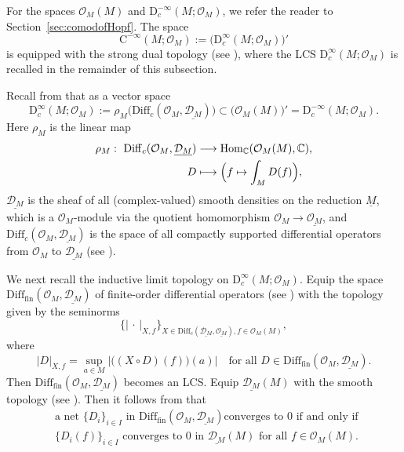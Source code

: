 \documentclass[12pt, a4paper]{amsart}
\newcommand{\CO}{{\mathcal {O}}}
\newcommand{\RC}{{\mathrm {C}}}
\newcommand{\RD}{{\mathrm {D}}}
\newcommand{\abs}[1]{\lvert#1\rvert}
\newcommand{\be}{\begin {equation}}
\newcommand{\ee}{\end {equation}}
\theoremstyle{Theorem}
\theoremstyle{Theorem}
\theoremstyle{Theorem}
\theoremstyle{Theorem}
\theoremstyle{Plain}
\theoremstyle{remark}
\theoremstyle{remark}
\theoremstyle{Definition}
\numberwithin{equation}{section}
\begin{document}
For the spaces $\CO_M(M)$ and $\RD^{-\infty}_c(M;\CO_M)$, we refer the reader to Section~\ref{sec:comodofHopf}. 
The space
\[
\RC^{-\infty}(M;\CO_M) := \bigl(\RD^{\infty}_c(M;\CO_M)\bigr)'
\]
is equipped with the strong dual topology (see \cite[(3.1)]{CSW2}), 
where the LCS $\RD^{\infty}_c(M;\CO_M)$ is recalled in the remainder of this subsection.

Recall from  \cite[(2.3)]{CSW2} that as a vector space 
\[
\RD^{\infty}_c(M;\CO_M)
:= \rho_M\bigl(\mathrm{Diff}_{c}(\CO_M,\underline{\mathcal{D}_M})\bigr)
\subset \bigl(\CO_M(M)\bigr)' = \RD^{-\infty}_c(M;\CO_M).
\]
 Here $\rho_M$ is the linear map
\begin{equation}
\begin{split}
\rho_M:\ \mathrm{Diff}_{c}(\CO_M,\underline{\mathcal{D}_M})
&\longrightarrow \mathrm{Hom}_{\mathbb C}(\CO_M(M),\mathbb C),\\
D &\longmapsto \Bigl( f \mapsto \int_{M} D(f) \Bigr),
\end{split}
\label{eq:defcomsuppden}
\end{equation}
$\underline{\mathcal{D}_M}$ is the sheaf of all (complex-valued) smooth densities on the reduction 
$\underline{M}$, which is a $\CO_M$-module via the quotient homomorphism $\CO_M\to\underline{\CO_M}$, 
and $\mathrm{Diff}_{c}(\CO_M,\underline{\mathcal{D}_M})$ is the space of all compactly supported differential operators from $\CO_M$ 
to $\underline{\mathcal{D}_M}$ (see \cite[Section 3.2]{CSW1}).


We next recall the inductive limit topology on $\RD^{\infty}_c(M;\CO_M)$.
Equip the space $\mathrm{Diff}_{\mathrm{fin}} (\CO_M,\underline{\mathcal{D}_M})$ of  finite-order differential operators (see \cite[Definition 3.6]{CSW1}) with the topology given by the seminorms \[\{\abs{\,\cdot\,}_{X,f}\}_{X\in \mathrm{Diff}_c(\underline{\mathcal{D}_M},\underline{\CO_M}), f\in \CO_M(M)},\] where \[\abs{D}_{X,f}=\sup_{a\in M}|\big((X\circ D)(f)\big)(a)| \quad\text{for all $D\in \mathrm{Diff}_{\mathrm{fin}} (\CO_M,\underline{\mathcal{D}_M})$}.\] Then $\mathrm{Diff}_{\mathrm{fin}} (\CO_M,\underline{\mathcal{D}_M})$ becomes an LCS. Equip $\underline{\mathcal{D}_M}(M)$ with the smooth topology (see \cite[Definition 4.1]{CSW1}). Then it follows from \cite[Lemma 2.8]{CSW2}  that 
\be\label{eq:convergence}
\begin{aligned}
&\text{a net $\{D_i\}_{i\in I}$  in $\mathrm{Diff}_{\mathrm{fin}}(\CO_M,\underline{\mathcal{D}_M})$
 converges to $0$ if and only if }  \\ & \text{$\{D_i(f)\}_{i\in I}$ converges to $0$ in $\underline{\mathcal{D}_M}(M)$ for all $f\in \CO_M(M)$.}
\end{aligned}
\ee
\end{document}
